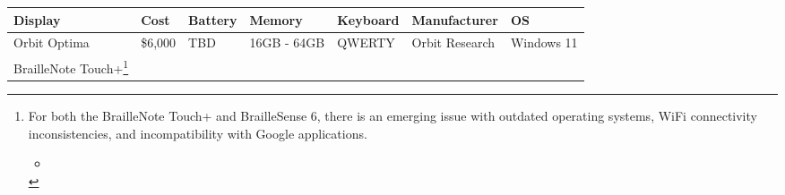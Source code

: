 \documentclass[14pt, letterpaper,twoside]{extreport}
\begin{document}
\begin{longtable}[]{@{}
	>{\raggedright\arraybackslash}p{}
	>{\raggedright\arraybackslash}p{}
	>{\raggedright\arraybackslash}p{}
	>{\raggedright\arraybackslash}p{}
	>{\raggedright\arraybackslash}p{}
	>{\raggedright\arraybackslash}p{}
	>{\raggedright\arraybackslash}p{}@{}
	}
	\toprule\noalign{}

	\textbf{Display}                                                                                                                                                                                                                             & \textbf{Cost}                             & \textbf{Battery} & \textbf{Memory} & \textbf{Keyboard} & \textbf{Manufacturer} & \textbf{OS}                                                                                                                                                                                                                                                                                                                                                                                 \\
	\midrule\noalign{}
	\endhead
	\bottomrule\noalign{}
	\endlastfoot
	Orbit Optima                                                                                                                                                                                                                                 & \$6,000                                   & TBD              & 16GB - 64GB     & QWERTY            & Orbit Research        & Windows 11                                                                                                                                                                                                                                                                                                                                                                                  \\[1.0em]
	BrailleNote Touch+\footnote{For both the BrailleNote Touch+ and BrailleSense 6, there is an emerging issue with outdated operating systems, WiFi connectivity inconsistencies, and incompatibility with Google applications. \begin{itemize}
			                                                                                                                                                                                                                             \item

\end{itemize}}
\end{longtable}
\end{document}
